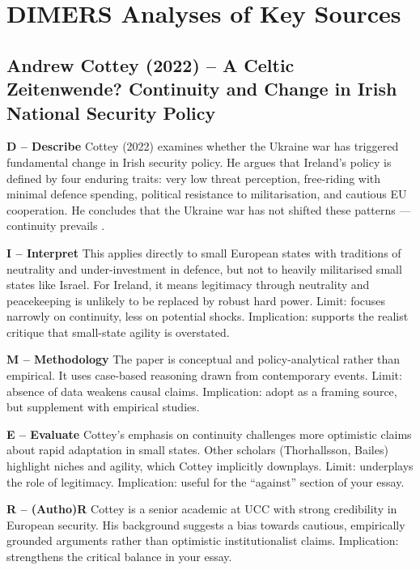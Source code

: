   
  
\section*{DIMERS Analyses of Key Sources}

\subsection*{Andrew Cottey (2022) – A Celtic Zeitenwende? Continuity and Change in Irish National Security Policy}

\textbf{D – Describe}  
Cottey (2022) examines whether the Ukraine war has triggered fundamental change in Irish security policy. He argues that Ireland’s policy is defined by four enduring traits: very low threat perception, free-riding with minimal defence spending, political resistance to militarisation, and cautious EU cooperation. He concludes that the Ukraine war has not shifted these patterns — continuity prevails \parencite{COTTEY_2022}.

\textbf{I – Interpret}  
This applies directly to small European states with traditions of neutrality and under-investment in defence, but not to heavily militarised small states like Israel. For Ireland, it means legitimacy through neutrality and peacekeeping is unlikely to be replaced by robust hard power. Limit: focuses narrowly on continuity, less on potential shocks. Implication: supports the realist critique that small-state agility is overstated.

\textbf{M – Methodology}  
The paper is conceptual and policy-analytical rather than empirical. It uses case-based reasoning drawn from contemporary events. Limit: absence of data weakens causal claims. Implication: adopt as a framing source, but supplement with empirical studies.

\textbf{E – Evaluate}  
Cottey’s emphasis on continuity challenges more optimistic claims about rapid adaptation in small states. Other scholars (Thorhallsson, Bailes) highlight niches and agility, which Cottey implicitly downplays. Limit: underplays the role of legitimacy. Implication: useful for the “against” section of your essay.

\textbf{R – (Autho)R}  
Cottey is a senior academic at UCC with strong credibility in European security. His background suggests a bias towards cautious, empirically grounded arguments rather than optimistic institutionalist claims. Implication: strengthens the critical balance in your essay.

